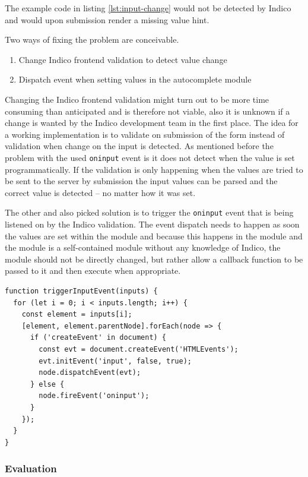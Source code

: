 The example code in listing \ref{lst:input-change} would not be detected by Indico and would upon submission render a missing value hint.

Two ways of fixing the problem are conceivable.

\begin{enumerate}
    \item Change Indico frontend validation to detect value change
    \item Dispatch event when setting values in the autocomplete module
\end{enumerate}

Changing the Indico frontend validation might turn out to be more time consuming than anticipated and is therefore not viable, also it is unknown if a change is wanted by the Indico development team in the first place. The idea for a working implementation is to validate on submission of the form instead of validation when change on the input is detected. As mentioned before the problem with the used \texttt{oninput} event is it does not detect when the value is set programmatically. If the validation is only happening when the values are tried to be sent to the server by submission the input values can be parsed and the correct value is detected -- no matter how it was set. 

The other and also picked solution is to trigger the \texttt{oninput} event that is being listened on by the Indico validation. The event dispatch needs to happen as soon the values are set within the module and because this happens in the module and the module is a self-contained module without any knowledge of Indico, the module should not be directly changed, but rather allow a callback function to be passed to it and then execute when appropriate.

\begin{lstlisting}[language=Other,columns=fullflexible, caption={Dispatching the \texttt{oninput} event within a callback.}, label={lst:oninput-callback}]
function triggerInputEvent(inputs) {
  for (let i = 0; i < inputs.length; i++) {
    const element = inputs[i];
    [element, element.parentNode].forEach(node => {
      if ('createEvent' in document) {
        const evt = document.createEvent('HTMLEvents');
        evt.initEvent('input', false, true);
        node.dispatchEvent(evt);
      } else {
        node.fireEvent('oninput');
      }
    });
  }
}
\end{lstlisting}

\subsubsection{Evaluation}\mbox{}\\

